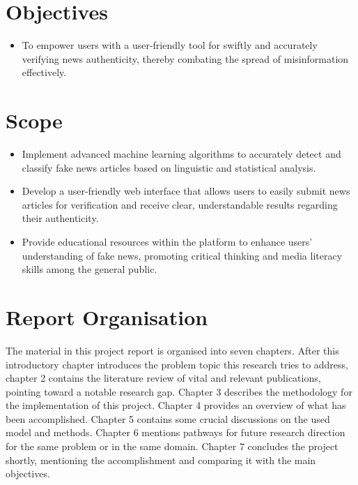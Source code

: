 \section{Objectives}
\begin{itemize}
    \item  To empower users with a user-friendly tool for swiftly and accurately verifying news authenticity, thereby combating the spread of misinformation effectively.
\end{itemize}
\section{Scope}

\begin{itemize}
    \item Implement advanced machine learning algorithms to accurately detect and classify fake news articles based on linguistic and statistical analysis.
    \item Develop a user-friendly web interface that allows users to easily submit news articles for verification and receive clear, understandable results regarding their authenticity.
    \item Provide educational resources within the platform to enhance users' understanding of fake news, promoting critical thinking and media literacy skills among the general public.
    
\end{itemize}
\section{Report Organisation}
The material in this project report is organised into seven chapters. After this introductory chapter introduces the problem topic this research tries to address, chapter 2 contains the literature review of vital and relevant publications, pointing toward a notable research gap. Chapter 3 describes the methodology for the implementation of this project. Chapter 4 provides an overview of what has been accomplished. Chapter 5 contains some crucial discussions on the used model and methods. Chapter 6 mentions pathways for future research direction for the same problem or in the same domain. Chapter 7 concludes the project shortly, mentioning the accomplishment and comparing it with the main objectives.